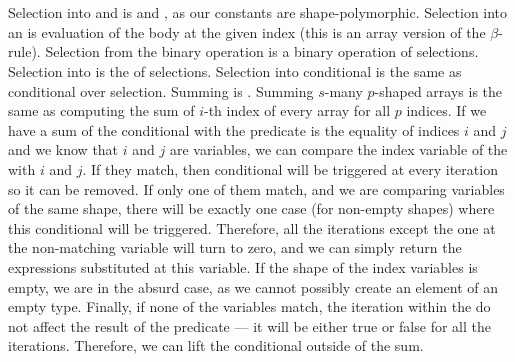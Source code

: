 \begin{code}
%
\>[30]\AgdaSymbol{=}\AgdaSpace{}%
\AgdaSpace{}%
\AgdaSymbol{(}\AgdaSpace{}%
\AgdaSymbol{)}\AgdaSpace{}%
\AgdaSymbol{(}\AgdaSpace{}%
\AgdaSymbol{)}\AgdaSpace{}%
\AgdaSymbol{(}\AgdaSpace{}%
\AgdaSymbol{)}\<%
\\
%
\>[2]\AgdaSpace{}%
\AgdaCatchallClause{\AgdaSymbol{(}}\AgdaSpace{}%
\AgdaCatchallClause{\AgdaSymbol{)}}\AgdaSpace{}%
\AgdaCatchallClause{\AgdaSymbol{|}}\AgdaSpace{}%
\AgdaSpace{}%
\AgdaSymbol{=}\AgdaSpace{}%
\AgdaSpace{}%
\<%
\\
%
\>[2]\<%
\end{code}
Selection into  and  is  and , as our constants
are shape-polymorphic.  Selection into an  is evaluation of the 
body at the given index (this is an array version of the $\beta$-rule).  Selection
from the binary operation is a binary operation of selections.  Selection into 
is the  of selections.  Selection into conditional is the same as conditional
over selection.  Summing  is .  Summing $s$-many $p$-shaped arrays
is the same as computing the sum of $i$-th index of every array for all $p$ indices.
If we have a sum of the conditional with the predicate is the equality of indices
$i$ and $j$ and we know that $i$ and $j$ are variables, we can compare the index
variable of the  with $i$ and $j$.  If they match, then conditional will
be triggered at every iteration so it can be removed.  If only one of them match,
and we are comparing variables of the same shape, there will be exactly one case
(for non-empty shapes) where this conditional will be triggered.  Therefore, all
the iterations except the one at the non-matching variable will turn to zero, and
we can simply return the expressions substituted at this variable.  If the shape
of the index variables is empty, we are in the absurd case, as we cannot possibly
create an element of an empty type.  Finally, if none of the variables match,
the iteration within the  do not affect the result of the predicate ---
it will be either true or false for all the iterations.  Therefore, we can lift
the conditional outside of the sum.
